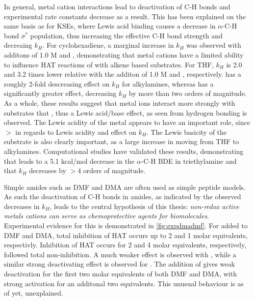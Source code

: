 In general, metal cation interactions lead to deactivation of C-H bonds and
experimental rate constants decrease as a result. This has been explained on the
same basis as for KSEs, where Lewis acid binding causes a decrease in
$\alpha$-C-H bond $\sigma^*$ population, thus increasing the effective C-H bond
strength and decreaing $k_H$. For cyclohexadiene, a marginal increase in $k_H$
was observed with additons of 1.0 M  and ,
demonstrating that metal cations have a limited ability to influence HAT
reactions of \cumo with alkene based substrates. For THF, $k_H$ is 2.0 and 3.2
times lower relative with the additon of 1.0 M  and ,
respectively.  has a roughly 2-fold descreasing effect on $k_H$ for
alkylamines, whereas  has a significantly greater effect,
decreasing $k_H$ by more than two orders of magnitude. As a whole, these results
suggest that metal ions interact more strongly with substrates that \cumo, thus
a Lewis acid/base effect, as seen from hydrogen bonding is observed. The Lewis
acidity of the metal appears to have an important role, since  $>$
 in regards to Lewis acidity and effect on $k_H$. The Lewis basicity
of the substrate is also clearly important, as a large increase in moving from
THF to alkylamines. Computational studies have validated these results,
demonstrating that  leads to a 5.1 kcal/mol decrease in the
$\alpha$-C-H BDE in triethylamine and that $k_H$ decreases by $>4$ orders of
magnitude.\cite{Nova2014}

Simple amides such as DMF and DMA are often used as simple peptide
models.\cite{Salamone2015a} As such the deactivation of C-H bonds in amides, as
indicated by the observed decreases in $k_H$, leads to the central hypothesis of
this thesis: \emph{non-redox active metals cations can serve as chemoprotective
  agents for biomolecules}. Experimental evidence for this is demonstrated in
\ref{fig:expdmadmf}. For  added to DMF and DMA, total inhibition of
HAT occurs up to 2 and 1 molar equivalents, respectivly. Inhibition of HAT
occurs for 2 and 4 molar equivalents, respectively, followed total
non-inhibition. A much weaker effect is observed with , while a
similar strong deactivating effect is observed for . The addition
of  gives weak deactivation for the first two molar equivalents of
both DMF and DMA, with strong activation for an additonal two equivalents. This
unusual behaviour is as of yet, unexplained.

